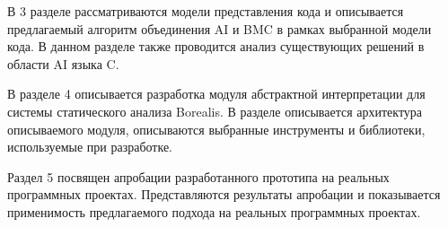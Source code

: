 В 3 разделе рассматриваются модели представления кода и описывается предлагаемый 
алгоритм объединения AI и BMC в рамках выбранной модели кода. В данном разделе
также проводится анализ существующих решений в области AI языка C.

В разделе 4 описывается разработка модуля абстрактной интерпретации для системы 
статического анализа Borealis. В разделе описывается архитектура описываемого 
модуля, описываются выбранные инструменты и библиотеки, используемые при 
разработке.

Раздел 5 посвящен апробации разработанного прототипа на реальных программных 
проектах. Представляются результаты апробации и показывается применимость
предлагаемого подхода на реальных программных проектах.